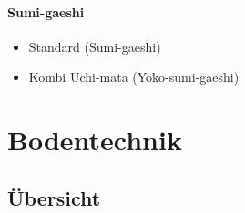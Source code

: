 \documentclass[justified, a4paper, notitlepage, captions=tableheading, nobib]{tufte-handout}
\begin{document}
\paragraph{Sumi-gaeshi }
\label{sec:orga8b0d20}
\begin{itemize}
\item Standard (Sumi-gaeshi)
\item Kombi Uchi-mata (Yoko-sumi-gaeshi)
\end{itemize}

\newpage
\section{Bodentechnik }
\label{sec:org8164732}
\subsection{Übersicht}
\label{sec:org5b6b705}
\end{document}
